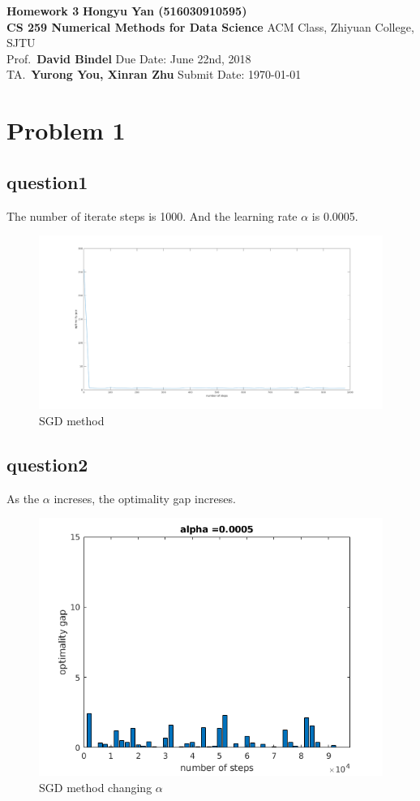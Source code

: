 \documentclass[a4paper, 11pt]{article}
\begin{document}
\noindent
\large\textbf{Homework 3} \hfill \textbf{Hongyu Yan (516030910595)} \\
\normalsize {\bf CS 259 Numerical Methods for Data Science} \hfill ACM Class, Zhiyuan College, SJTU\\
Prof.~{\bf David Bindel} \hfill Due Date: June 22nd, 2018\\
TA.~{\bf Yurong You, Xinran Zhu} \hfill Submit Date: \today

\section*{Problem 1}

\subsection*{question1}
The number of iterate steps is 1000. And the learning rate $\alpha$ is 0.0005.
\begin{figure}[htbp]
\centering
\includegraphics[scale=0.3]{figure/p1_1_1.png}
\caption{SGD method}
\label{p1_1}
\end{figure}

\subsection*{question2}
As the $\alpha$ increses, the optimality gap increses.

\begin{figure}[htbp]
\centering
\includegraphics[scale=0.7]{figure/p1_2_1.png}
\caption{SGD method changing $\alpha$}
\label{p1_2_1}
\end{figure}
\end{document}
